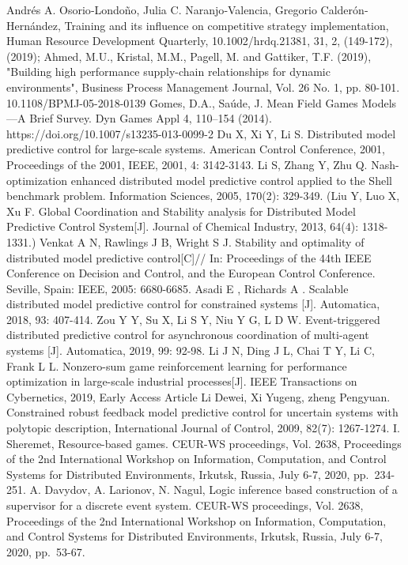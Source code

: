 \documentclass[runningheads]{llncs}
\begin{document}
\begin{thebibliography}{999}
     Andrés A. Osorio‐Londoño, Julia C. Naranjo‐Valencia, Gregorio Calderón‐Hernández, Training and its influence on competitive strategy implementation, Human Resource Development Quarterly, 10.1002/hrdq.21381, 31, 2, (149-172), (2019); Ahmed, M.U., Kristal, M.M., Pagell, M. and Gattiker, T.F. (2019), "Building high performance supply-chain relationships for dynamic environments", Business Process Management Journal, Vol. 26 No. 1, pp. 80-101. 10.1108/BPMJ-05-2018-0139
      Gomes, D.A., Saúde, J. Mean Field Games Models—A Brief Survey. Dyn Games Appl 4, 110–154 (2014). https://doi.org/10.1007/s13235-013-0099-2
     Du X, Xi Y, Li S. Distributed model predictive control for large-scale systems. American Control Conference, 2001, Proceedings of the 2001, IEEE, 2001, 4: 3142-3143.
       Li S, Zhang Y, Zhu Q. Nash-optimization enhanced distributed model predictive control applied to the Shell benchmark problem. Information Sciences, 2005, 170(2): 329-349.
       (Liu Y, Luo X, Xu F. Global Coordination and Stability analysis for 	Distributed Model Predictive Control System[J]. Journal of Chemical Industry, 2013, 64(4): 1318-1331.)
       Venkat A N, Rawlings J B, Wright S J. Stability and optimality of 	distributed model predictive control[C]// In: Proceedings of the 44th IEEE Conference on Decision and Control, and the European Control Conference. Seville, Spain: IEEE, 2005: 6680-6685.
       Asadi E , Richards A . Scalable distributed model predictive control for constrained systems [J]. Automatica, 2018, 93: 407-414.
       Zou Y Y, Su X, Li S Y, Niu Y G, L D W. Event-triggered distributed predictive control for asynchronous coordination of multi-agent systems [J]. Automatica, 2019, 99: 92-98.
       Li J N, Ding J L, Chai T Y, Li C, Frank L L. Nonzero-sum game reinforcement learning for performance optimization in large-scale industrial processes[J]. IEEE Transactions on Cybernetics, 2019, Early Access Article
       Li Dewei, Xi Yugeng, zheng Pengyuan. Constrained robust feedback model predictive control for uncertain systems with polytopic description, International Journal of Control, 2009, 82(7): 1267-1274.
       I. Sheremet, Resource-based games. CEUR-WS proceedings, Vol. 2638, Proceedings of the 2nd International Workshop on Information, Computation, and Control Systems for Distributed Environments, Irkutsk, Russia, July 6-7, 2020, pp.~234-251.
       A. Davydov, A. Larionov, N. Nagul, Logic inference based construction of a supervisor for a discrete event system. CEUR-WS proceedings, Vol. 2638, Proceedings of the 2nd International Workshop on Information, Computation, and Control Systems for Distributed Environments, Irkutsk, Russia, July 6-7, 2020,  pp.~53-67.

\end{thebibliography}
\end{document}
